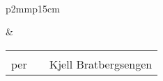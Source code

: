 \documentclass[a4paper,12pt]{article}
\begin{document}
\pagestyle{empty}
\vfill{}
\begin{centering}

\quad \\
\vspace{60mm}

\begin{tabular}{p{2mm}p{15cm}}

&

\begin{minipage}[c]{15cm}
\begin{centering}

\begin{tabular}{cp{20mm}c}

\cline{1-1} & & \cline{1-1} \\
per         & & Kjell Bratbergsengen \\

\end{tabular}

\end{centering}
\end{minipage}

\end{tabular}

\end{centering}
\vfill{}
\end{document}
